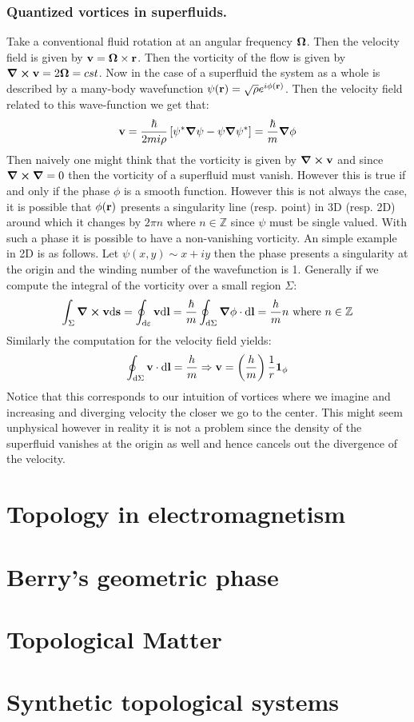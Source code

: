 \documentclass[10pt,a4paper]{book}
\begin{document}
\subsubsection{Quantized vortices in superfluids.}
Take a conventional fluid rotation at an angular frequency $\vb{\Omega}$. Then the velocity field is given by $\vb{v} = \vb{\Omega} \times \vb{r}$. Then the vorticity of the flow is given by $\curl \vb{v} = 2 \vb{\Omega} = cst$. Now in the case of a superfluid the system as a whole is described by a many-body wavefunction $\psi(\vb{r}) = \sqrt{\rho} e^{i \phi (\vb{r})}$. Then the velocity field related to this wave-function we get that:
\[
\vb{v} = \frac{\hbar}{2 m i \rho} \left[ \psi^* \grad \psi - \psi \grad \psi^* \right] = \frac{\hbar}{m} \grad \phi
\]
Then naively one might think that the vorticity is given by $\curl \vb{v}$ and since $\curl \grad = 0$ then the vorticity of a superfluid must vanish. However this is true if and only if the phase $\phi$ is a smooth function. However this is not always the case, it is possible that $\phi(\vb{r})$ presents a singularity line (resp. point) in 3D (resp. 2D) around which it changes by $2\pi n$ where $n \in \mathbb{Z}$ since $\psi$ must be single valued. With such a phase it is possible to have a non-vanishing vorticity. An simple example in 2D is as follows. Let $\psi(x,y) \sim x + iy$ then the phase presents a singularity at the origin and the winding number of the wavefunction is 1. Generally if we compute the integral of the vorticity over a small region $\Sigma$:
\[
\int_\Sigma \curl \vb{v} \dd \vb{s} = \oint_{\dd \varepsilon} \vb{v} \dd \vb{l} =  \frac{\hbar}{m} \oint_{\dd\Sigma} \grad \phi \cdot  \dd \vb{l} = \frac{h}{m} n \text{ where } n \in \mathbb{Z}
\] 
Similarly the computation for the velocity field yields:
\[
\oint_{\dd\Sigma} \vb{v} \cdot \dd \vb{l} = \frac{h}{m} \Rightarrow \vb{v} = \left(\frac{h}{m}\right)\frac{1}{r} \vb{1}_\phi
\]
Notice that this corresponds to our intuition of vortices where we imagine and increasing and diverging velocity the closer we go to the center. This might seem unphysical however in reality it is not a problem since the density of the superfluid vanishes at the origin as well and hence cancels out the divergence of the velocity. 
\section{Topology in electromagnetism}
\section{Berry's geometric phase}
\section{Topological Matter}
\section{Synthetic topological systems}
\end{document}
